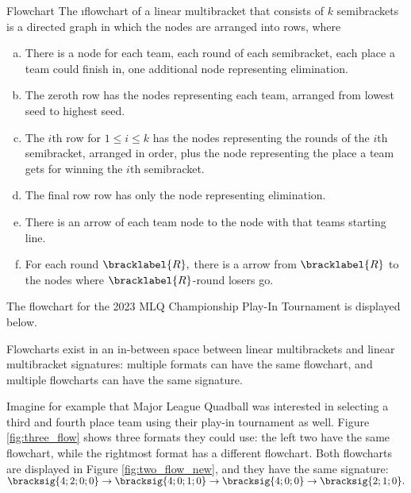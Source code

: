 {    \begin{definition}{Flowchart}{}
        The \i{flowchart} of a linear multibracket that consists of $k$ semibrackets is a directed graph in which the nodes are arranged into rows, where
        \begin{enumerate}[(a)]
            \item There is a node for each team, each round of each semibracket, each place a team could finish in, one additional node representing elimination.
            \item The zeroth row has the nodes representing each team, arranged from lowest seed to highest seed.
            \item The $i$th row for $1 \leq i \leq k$ has the nodes representing the rounds of the $i$th semibracket, arranged in order, plus the node representing the place a team gets for winning the $i$th semibracket.
            \item The final row row has only the node representing elimination.
            \item There is an arrow of each team node to the node with that teams starting line.
            \item For each round $\bracklabel{R},$ there is a arrow from $\bracklabel{R}$ to the nodes where $\bracklabel{R}$-round losers go.
        \end{enumerate}
    \end{definition}

    The flowchart for the 2023 MLQ Championship Play-In Tournament is displayed below.


    Flowcharts exist in an in-between space between linear multibrackets and linear multibracket signatures: multiple formats can have the same flowchart, and multiple flowcharts can have the same signature.

    Imagine for example that Major League Quadball was interested in selecting a third and fourth place team using their play-in tournament as well. Figure \ref{fig:three_flow} shows three formats they could use: the left two have the same flowchart, while the rightmost format has a different flowchart. Both flowcharts are displayed in Figure \ref{fig:two_flow_new}, and they have the same signature:  $\bracksig{4;2;0;0} \to \bracksig{4;0;1;0} \to \bracksig{4;0;0} \to \bracksig{2;1;0}.$


}

